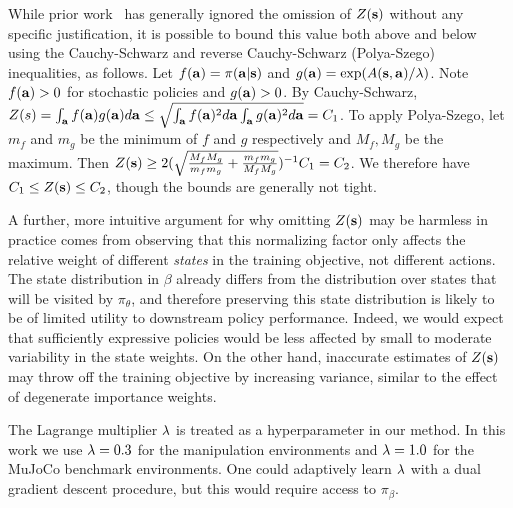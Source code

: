\documentclass[conference]{IEEEtran}
\begin{document}
While prior work~\citep{neumann2008fqiawr, wang2018marwil, peng2019awr} has generally ignored the omission of $Z(\mathbf{s})$ without any specific justification, it is possible to bound this value both above and below using the Cauchy-Schwarz and reverse Cauchy-Schwarz (Polya-Szego) inequalities, as follows.
Let $f(\mathbf{a}) = \pi(\mathbf{a}|\mathbf{s})$ and $g(\mathbf{a}) = \exp(A(\mathbf{s}, \mathbf{a})/\lambda)$. Note $f(\mathbf{a}) > 0$ for stochastic policies and $g(\mathbf{a}) > 0$.
By Cauchy-Schwarz, $Z(s) = \int_{\mathbf{a}} f(\mathbf{a}) g(\mathbf{a}) d\mathbf{a} \leq \sqrt{\int_{\mathbf{a}} f(\mathbf{a})^2 d\mathbf{a} \int_{\mathbf{a}} g(\mathbf{a})^2 d\mathbf{a}} = C_1$. To apply Polya-Szego, let $m_f$ and $m_g$ be the minimum of $f$ and $g$ respectively and $M_f, M_g$ be the maximum. Then $Z(\mathbf{s}) \geq 2 (\sqrt{\frac{M_f M_g}{m_f m_g} + \frac{m_f m_g}{M_f M_g}})^{-1} C_1 = C_2$. We therefore have $C_1 \leq Z(\mathbf{s}) \leq C_2$, though the bounds are generally not tight.

A further, more intuitive argument for why omitting $Z(\mathbf{s})$ may be harmless in practice comes from observing that this normalizing factor only affects the relative weight of different \emph{states} in the training objective, not different actions. The state distribution in $\beta$ already differs from the distribution over states that will be visited by $\pi_\theta$, and therefore preserving this state distribution is likely to be of limited utility to downstream policy performance. Indeed, we would expect that sufficiently expressive policies would be less affected by small to moderate variability in the state weights. On the other hand, inaccurate estimates of $Z(\mathbf{s})$ may throw off the training objective by increasing variance, similar to the effect of degenerate importance weights.


The Lagrange multiplier $\lambda$ is treated as a hyperparameter in our method. In this work we use $\lambda = 0.3$ for the manipulation environments and $\lambda = 1.0$ for the MuJoCo benchmark environments. One could adaptively learn $\lambda$ with a dual gradient descent procedure, but this would require access to $\pi_\beta$.
\end{document}
